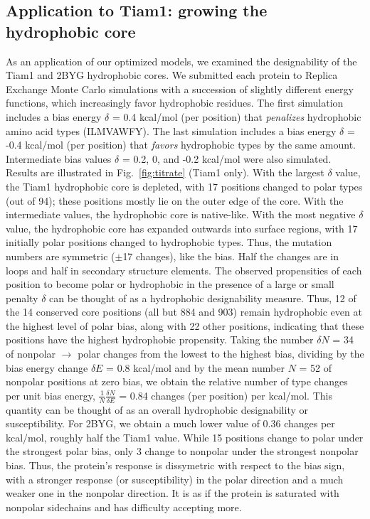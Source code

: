 \documentclass[12pt]{article}
\begin{document}
\subsection{Application to Tiam1: growing the hydrophobic core}
As an application of our optimized models, we examined the designability of the Tiam1 and 2BYG hydrophobic cores. We submitted
each protein to Replica Exchange Monte Carlo simulations with a succession of slightly different energy functions, which increasingly
favor hydrophobic residues. The first simulation includes a bias energy $\delta$ = 0.4 kcal/mol (per position) that {\it penalizes}
hydrophobic amino acid types (ILMVAWFY). The last simulation includes a bias energy $\delta$ = -0.4 kcal/mol (per position) that
{\it favors} hydrophobic types by the same amount. Intermediate bias values $\delta$ = 0.2, 0, and -0.2 kcal/mol were also simulated.
Results are illustrated in Fig.\ \ref{fig:titrate} (Tiam1 only). With the largest $\delta$ value, the Tiam1 hydrophobic core is depleted,
with 17 positions changed to polar types (out of 94); these positions mostly lie on the outer edge of the core. With the intermediate
values, the hydrophobic core is native-like. With the most negative $\delta$ value, the hydrophobic core has expanded outwards into
surface regions, with 17 initially polar positions changed to hydrophobic types. Thus, the mutation numbers are symmetric ($\pm$17
changes), like the bias. Half the changes are in loops and half in secondary structure elements. The observed propensities of each
position to become polar or hydrophobic in the presence of a large or small penalty $\delta$ can be thought of as a hydrophobic
designability measure. Thus, 12 of the 14 conserved core positions (all but 884 and 903) remain hydrophobic even at the highest level
of polar bias, along with 22 other positions, indicating that these positions have the highest hydrophobic propensity. Taking the
number $\delta N$ = 34 of nonpolar $\rightarrow$ polar changes from the lowest to the highest bias, dividing by the bias energy change
$\delta E$ = 0.8 kcal/mol and by the mean number $N$ = 52 of nonpolar positions at zero bias, we obtain the relative number of type
changes per unit bias energy, $\frac{1}{N}\frac{\delta N}{\delta E}$ = 0.84 changes (per position) per kcal/mol. This quantity can
be thought of as an overall hydrophobic designability or susceptibility. For 2BYG, we obtain a much lower value of 0.36 changes per
kcal/mol, roughly half the Tiam1 value. While 15 positions change to polar under the strongest polar bias, only 3 change to nonpolar
under the strongest nonpolar bias. Thus, the protein's response is dissymetric with respect to the bias sign, with a stronger
response (or susceptibility) in the polar direction and a much weaker one in the nonpolar direction. It is as if the protein is
saturated with nonpolar sidechains and has difficulty accepting more.
\end{document}
